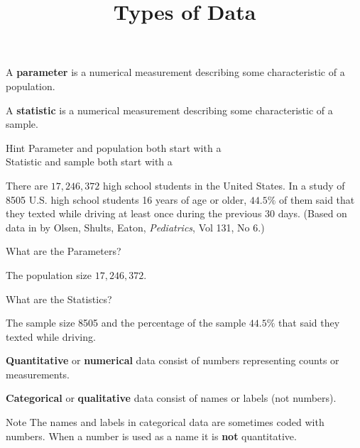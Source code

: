 \documentclass{beamer}
\title[MA205 - Section 1.2]{Types of Data}
\begin{document}
\begin{frame}
\titlepage
\end{frame}

\begin{frame}
\begin{definition}
A \textbf{parameter} is a numerical measurement describing some characteristic of a population.
\end{definition}\pause
\begin{definition}
A \textbf{statistic} is a numerical measurement describing some characteristic of a sample.
\end{definition}\pause
\begin{block}{Hint}
Parameter and population both start with a \\Statistic and sample both start with a 
\end{block}
\end{frame}

\begin{frame}
\begin{example}
There are $17,246,372$ high school students in the United States. In a study of 8505 U.S. high school students 16 years of age or older, $44.5\%$ of them said that they texted while driving at least once during the previous 30 days. (Based on data in  by Olsen, Shults, Eaton, \emph{Pediatrics}, Vol 131, No 6.)\pause

\vspace{4mm}
What are the Parameters?\pause

\vspace{1mm}
The population size $17,246,372$.\pause

\vspace{4mm}
What are the Statistics?\pause

\vspace{1mm}
The sample size 8505 and the percentage of the sample $44.5\%$ that said they texted while driving.
\end{example}
\end{frame}

\begin{frame}
\begin{definition}
\textbf{Quantitative} or \textbf{numerical} data consist of numbers representing counts or measurements.
\end{definition}\pause

\begin{definition}
\textbf{Categorical} or \textbf{qualitative} data consist of names or labels (not numbers).
\end{definition}\pause

\begin{block}{Note}
The names and labels in categorical data are sometimes coded with numbers. When a number is used as a name it is \textbf{not} quantitative.
\end{block}
\end{frame}
\end{document}
